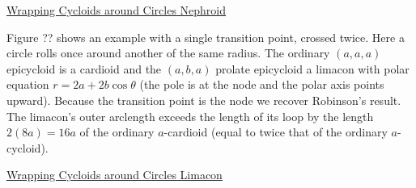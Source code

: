 \documentclass{ximera}
\begin{document}
\href{https://www.desmos.com/calculator/czhdwjarf3}{Wrapping Cycloids around Circles Nephroid}



Figure ?? shows an example with a single transition point, crossed twice.  Here a circle rolls once around another of the same radius. The ordinary $(a,a,a)$ epicycloid is a cardioid and the $(a,b,a)$ prolate epicycloid a limacon with polar equation $r=2a+2b\cos\theta$ (the pole is at the node and the polar axis points upward). Because the transition point is the node we recover Robinson's result. The limacon's outer arclength exceeds the length of its loop by the length $2(8a) = 16a$ of the ordinary $a$-cardioid (equal to twice that of the ordinary $a$-cycloid).

\begin{onlineOnly}
    \begin{center}
\end{center}
\end{onlineOnly}

\href{https://www.desmos.com/calculator/kuhagddz3r}{Wrapping Cycloids around Circles Limacon}





\end{document}
